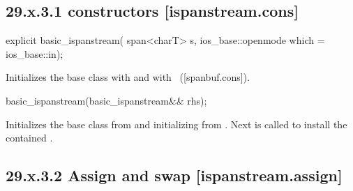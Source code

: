 \documentclass[ebook,11pt,article]{memoir}
\renewcommand{\iref}[1]{[#1]}
\begin{document}

\subsection{29.x.3.1  constructors [ispanstream.cons]}
\label{ispanstream.cons}

\begin{itemdecl}
explicit basic_ispanstream(
  span<charT> s,
  ios_base::openmode which = ios_base::in);
\end{itemdecl}

\begin{itemdescr}
\pnum
\effects
Initializes the base class with
and  with
~(\iref{spanbuf.cons}).
\end{itemdescr}

\begin{itemdecl}
basic_ispanstream(basic_ispanstream&& rhs);
\end{itemdecl}

\begin{itemdescr}
\pnum
\effects 
Initializes the base class from  
and initializing  from .
Next  is called to
install the contained .
\end{itemdescr}

\subsection{29.x.3.2 Assign and swap [ispanstream.assign]}
\label{ispanstream.assign}
\end{document}
